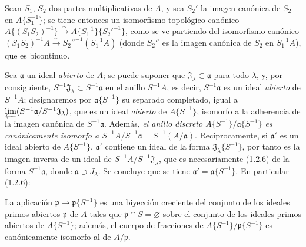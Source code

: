 \begin{env}[7.6.8]
\label{0.7.6.8-fr}
Sean $S_1$, $S_2$ dos partes multiplicativas de $A$, y sea $S_2'$ la imagen
canónica de $S_2$ en $A\{S_1^{-1}\}$; se tiene entonces un isomorfismo
topológico canónico
$A\{(S_1S_2)^{-1}\}\xrightarrow{\sim}A\{S_1^{-1}\}\{{S_2'}^{-1}\}$,
como se ve partiendo del isomorfismo canónico
$(S_1S_2)^{-1}A\xrightarrow{\sim}{S_2''}^{-1}(S_1^{-1}A)$ (donde $S_2''$ es
la imagen canónica de $S_2$ en $S_1^{-1}A$), que es bicontinuo.
\end{env}

\begin{env}[7.6.9]
\label{0.7.6.9-fr}
Sea $\mathfrak a$ un ideal \emph{abierto} de $A$; se puede suponer que
$\mathfrak J_\lambda\subset\mathfrak a$ para todo $\lambda$, y, por consiguiente,
$S^{-1}\mathfrak J_\lambda\subset S^{-1}\mathfrak a$ en el anillo
$S^{-1}A$, es decir, $S^{-1}\mathfrak a$ es un ideal \emph{abierto} de
$S^{-1}A$; designaremos por $\mathfrak a\{S^{-1}\}$ su separado completado,
igual a $\varprojlim(S^{-1}\mathfrak a/S^{-1}\mathfrak J_\lambda)$, que es un
ideal \emph{abierto} de $A\{S^{-1}\}$, isomorfo a la adherencia de la imagen
canónica de $S^{-1}\mathfrak a$. Además, \emph{el anillo discreto
$A\{S^{-1}\}/\mathfrak a\{S^{-1}\}$ es canónicamente isomorfo a
$S^{-1}A/S^{-1}\mathfrak a=S^{-1}(A/\mathfrak a)$}. Recíprocamente, si
$\mathfrak a'$ es un ideal abierto de $A\{S^{-1}\}$, $\mathfrak a'$ contiene
un ideal de la forma $\mathfrak J_\lambda\{S^{-1}\}$, por tanto es la imagen
inversa de un ideal de $S^{-1}A/S^{-1}\mathfrak J_\lambda$, que es
necesariamente (1.2.6) de la forma $S^{-1}\mathfrak a$, donde
$\mathfrak a\supset J_\lambda$. Se concluye que se tiene
$\mathfrak a'=\mathfrak a\{S^{-1}\}$. En particular (1.2.6):
\end{env}

\begin{proposition}[7.6.10]
\label{0.7.6.10-fr}
La aplicación $\mathfrak p\to\mathfrak p\{S^{-1}\}$ es una biyección
creciente del conjunto de los ideales \textup{primos abiertos} $\mathfrak p$ de $A$ tales
que $\mathfrak p\cap S=\varnothing$ sobre el conjunto de los ideales \textup{primos abiertos}
de $A\{S^{-1}\}$; además, el cuerpo de fracciones de
$A\{S^{-1}\}/\mathfrak p\{S^{-1}\}$ es canónicamente isomorfo al de
$A/\mathfrak p$.
\end{proposition}

